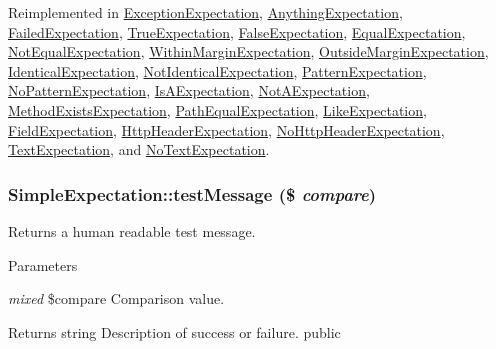 Reimplemented in \hyperlink{class_exception_expectation_a302c92bdfd0dc2bb308e8f85628dbc2b}{ExceptionExpectation}, \hyperlink{class_anything_expectation_a770e43480dbda7ce6c9761b88ab980cd}{AnythingExpectation}, \hyperlink{class_failed_expectation_a01fe75b5ab2a291476d724f909c43ef2}{FailedExpectation}, \hyperlink{class_true_expectation_a8a9057241e7d630877fcc92caa1d6cf4}{TrueExpectation}, \hyperlink{class_false_expectation_aabecb220dd0d3768ea8250aa280e5c34}{FalseExpectation}, \hyperlink{class_equal_expectation_a412b216b1ba36e37d342aebb821ccb55}{EqualExpectation}, \hyperlink{class_not_equal_expectation_a4d224959c7900fa36eadb05907129d4c}{NotEqualExpectation}, \hyperlink{class_within_margin_expectation_a3c8697495cb187b62bc6cf020e2e2ded}{WithinMarginExpectation}, \hyperlink{class_outside_margin_expectation_a6c68e08230af88b7cf33445bbc2ff24f}{OutsideMarginExpectation}, \hyperlink{class_identical_expectation_a6076cd232c16294ca0a7979ce11e57da}{IdenticalExpectation}, \hyperlink{class_not_identical_expectation_a2e3d68e7804396cb418a9ef2d00c128e}{NotIdenticalExpectation}, \hyperlink{class_pattern_expectation_a672fecfc691c4c115d4f4d37c365dae5}{PatternExpectation}, \hyperlink{class_no_pattern_expectation_adea22650021fb33f1d745aba552e6971}{NoPatternExpectation}, \hyperlink{class_is_a_expectation_a759f6a0c54751334dbb7a8aed01a3858}{IsAExpectation}, \hyperlink{class_not_a_expectation_a627e4e3a4514de8f869eaa5f62a5e206}{NotAExpectation}, \hyperlink{class_method_exists_expectation_a951ee8d86b351ad3b467ea57673526d3}{MethodExistsExpectation}, \hyperlink{class_path_equal_expectation_a8a557e7891f14b36955c89e142cdac95}{PathEqualExpectation}, \hyperlink{class_like_expectation_a58e0a803b7016efd6516fea5d9753f82}{LikeExpectation}, \hyperlink{class_field_expectation_a2c4a77d26920b75241f177d94e7b220e}{FieldExpectation}, \hyperlink{class_http_header_expectation_a22d6de67c863d5f596a90b64b4989637}{HttpHeaderExpectation}, \hyperlink{class_no_http_header_expectation_a3eeb88677fbcc6f33f719aec17d93013}{NoHttpHeaderExpectation}, \hyperlink{class_text_expectation_a352a2a95ccf1c29c886b7608338d3c20}{TextExpectation}, and \hyperlink{class_no_text_expectation_aea5e85eb1d03d5f48cb463f09d756a9e}{NoTextExpectation}.\hypertarget{class_simple_expectation_a15b69edf659c76f6543aa98d8d85b025}{
\subsubsection[{testMessage}]{\setlength{\rightskip}{0pt plus 5cm}SimpleExpectation::testMessage (\$ {\em compare})}}
\label{class_simple_expectation_a15b69edf659c76f6543aa98d8d85b025}
Returns a human readable test message. 
\begin{DoxyParams}{Parameters}
\item[{\em mixed}]\$compare Comparison value. \end{DoxyParams}
\begin{DoxyReturn}{Returns}
string Description of success or failure.  public  
\end{DoxyReturn}


